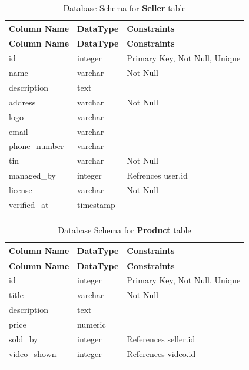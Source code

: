 \documentclass[12pt]{report}
\begin{document}
\begin{longtable}[H]{|l|l|p{6.5cm}||}
	\hline
	\textbf{Column Name} & \textbf{DataType} & \textbf{Constraints}          \\
	\hline
	\endfirsthead
	\hline
	\textbf{Column Name} & \textbf{DataType} & \textbf{Constraints}          \\
	\hline
	\endhead
	id                   & integer           & Primary Key, Not Null, Unique \\
	\hline
	name                 & varchar           & Not Null                      \\
	\hline
	description          & text              &                               \\
	\hline
	address              & varchar           & Not Null                      \\
	\hline
	logo                 & varchar           &                               \\
	\hline
	email                & varchar           &                               \\
	\hline
	phone\_number        & varchar           &                               \\
	\hline
	tin                  & varchar           & Not Null                      \\
	\hline
	managed\_by          & integer           & Refrences user.id             \\
	\hline
	license              & varchar           & Not Null                      \\
	\hline
	verified\_at         & timestamp         &                               \\
	\hline
	\hline
	\caption{Database Schema for \textbf{Seller} table}\label{tab:tableseller}
\end{longtable}

\begin{longtable}[H]{|l|l|p{6.5cm}||}
	\hline
	\textbf{Column Name} & \textbf{DataType} & \textbf{Constraints}          \\
	\hline
	\endfirsthead
	\hline
	\textbf{Column Name} & \textbf{DataType} & \textbf{Constraints}          \\
	\hline
	\endhead
	id                   & integer           & Primary Key, Not Null, Unique \\
	\hline
	title                & varchar           & Not Null                      \\
	\hline
	description          & text              &                               \\
	\hline
	price                & numeric           &                               \\
	\hline
	sold\_by             & integer           & References seller.id          \\
	\hline
	video\_shown         & integer           & References video.id           \\
	\hline
	\hline
	\caption{Database Schema for \textbf{Product} table}\label{tab:tableProduct}
\end{longtable}
\end{document}
